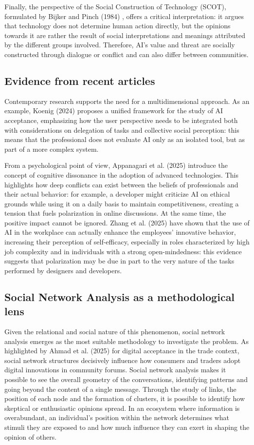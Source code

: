 \documentclass[conference]{IEEEtran}
\begin{document}
Finally, the perspective of the Social Construction of Technology (SCOT), formulated by Bijker and Pinch (1984) \cite{b3}, offers a critical interpretation: it argues that technology does not determine human action directly, but the opinions towards it are rather the result of social interpretations and meanings attributed by the different groups involved. Therefore, AI’s value and threat are socially constructed through dialogue or conflict and can also differ between communities.

\subsection{Evidence from recent articles}
Contemporary research supports the need for a multidimensional approach. As an example, Koenig (2024) \cite{b4} proposes a unified framework for the study of AI acceptance, emphasizing how the user perspective needs to be integrated both with considerations on delegation of tasks and collective social perception: this means that the professional does not evaluate AI only as an isolated tool, but as part of a more complex system.

From a psychological point of view, Appanagari et al. (2025) \cite{b5} introduce the concept of cognitive dissonance in the adoption of advanced technologies. This highlights how deep conflicts can exist between the beliefs of professionals and their actual behavior: for example, a developer might criticize AI on ethical grounds while using it on a daily basis to maintain competitiveness, creating a tension that fuels polarization in online discussions. At the same time, the positive impact cannot be ignored. Zhang et al. (2025) \cite{b6} have shown that the use of AI in the workplace can actually enhance the employees' innovative behavior, increasing their perception of self-efficacy, especially in roles characterized by high job complexity and in individuals with a strong open-mindedness: this evidence suggests that polarization may be due in part to the very nature of the tasks performed by designers and developers.

\subsection{Social Network Analysis as a methodological lens}
Given the relational and social nature of this phenomenon, social network analysis emerges as the most suitable methodology to investigate the problem. As highlighted by Ahmad et al. (2025) \cite{b7} for digital acceptance in the trade context, social network structures decisively influence how consumers and traders adopt digital innovations in community forums. Social network analysis makes it possible to see the overall geometry of the conversations, identifying patterns and going beyond the content of a single message. Through the study of links, the position of each node and the formation of clusters, it is possible to identify how skeptical or enthusiastic opinions spread. In an ecosystem where information is overabundant, an individual's position within the network determines what stimuli they are exposed to and how much influence they can exert in shaping the opinion of others.
\end{document}
